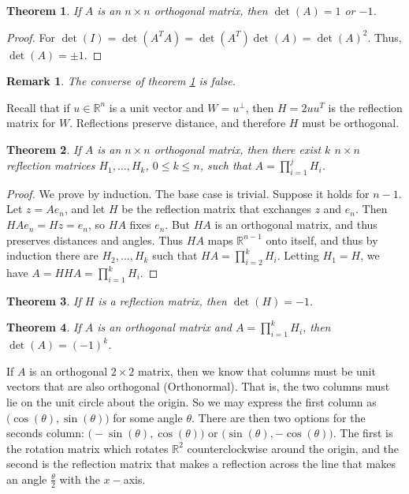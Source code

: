 \documentclass{article}
\theoremstyle{mystyle}
\newtheorem{theorem}{Theorem}[section]
\newtheorem{remark}{Remark}[section]
\begin{document}
\begin{theorem}
\label{theorem:LINEAR_ALGEBRA_orthogonal_matrices_have_determinant_pm_1}
If $A$ is an $n\times n$ orthogonal matrix, then $\det(A) = 1$ or $-1$.
\end{theorem}
\begin{proof}
For $\det(I) = \det(A^TA) = \det(A^T)\det(A) = \det(A)^2$. Thus, $\det(A) = \pm 1$.
\end{proof}
\begin{remark}
The converse of theorem \ref{theorem:LINEAR_ALGEBRA_orthogonal_matrices_have_determinant_pm_1} is false.
\end{remark}
Recall that if $u\in \mathbb{R}^n$ is a unit vector and $W = u^{\perp}$, then $H=2uu^T$ is the reflection matrix for $W$. Reflections preserve distance, and therefore $H$ must be orthogonal.
\begin{theorem}
If $A$ is an $n\times n$ orthogonal matrix, then there exist $k$ $n\times n$ reflection matrices $H_1,\hdots, H_k$, $0\leq k \leq n$, such that $A = \prod_{i=1}^{j}H_i$.
\end{theorem}
\begin{proof}
We prove by induction. The base case is trivial. Suppose it holds for $n-1$. Let $z = Ae_n$, and let $H$ be the reflection matrix that exchanges $z$ and $e_n$. Then $HAe_n = Hz = e_n$, so $HA$ fixes $e_n$. But $HA$ is an orthogonal matrix, and thus preserves distances and angles. Thus $HA$ maps $\mathbb{R}^{n-1}$ onto itself, and thus by induction there are $H_2,\hdots, H_k$ such that $HA = \prod_{i=2}^{k} H_i$. Letting $H_{1}=H$, we have $A = HHA = \prod_{i=1}^{k}H_i$.
\end{proof}
\begin{theorem}
If $H$ is a reflection matrix, then $\det(H) = -1$.
\end{theorem}
\begin{theorem}
If $A$ is an orthogonal matrix and $A=\prod_{i=1}^{k} H_i$, then $\det(A) = (-1)^k$.
\end{theorem}
If $A$ is an orthogonal $2\times 2$ matrix, then we know that columns must be unit vectors that are also orthogonal (Orthonormal). That is, the two columns must lie on the unit circle about the origin. So we may express the first column as $\big(\cos(\theta),\sin(\theta)\big)$ for some angle $\theta$. There are then two options for the seconds column: $\big(-\sin(\theta),\cos(\theta)\big)$ or $\big(\sin(\theta),-\cos(\theta)\big)$. The first is the rotation matrix which rotates $\mathbb{R}^2$ counterclockwise around the origin, and the second is the reflection matrix that makes a reflection across the line that makes an angle $\frac{\theta}{2}$ with the $x-$axis. 
\end{document}
